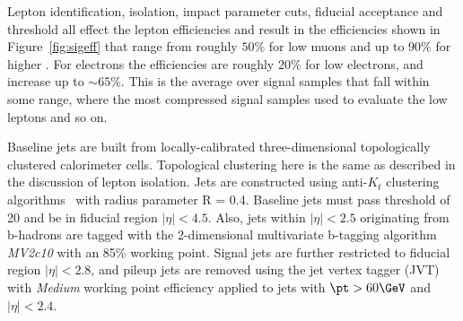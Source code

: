 Lepton identification, isolation, impact parameter cuts, fiducial acceptance and \pt threshold all effect the lepton efficiencies and result in the efficiencies shown in Figure~\ref{fig:sigeff} that range from roughly $50\%$ for low \pt muons and up to $90\%$ for higher \pt.  For electrons the efficiencies are roughly $20\%$ for low \pt electrons, and increase up to $\sim65\%$.  This is the average over signal samples that fall within some range, where the most compressed signal samples used to evaluate the low \pt leptons and so on.

Baseline jets are built from locally-calibrated three-dimensional topologically clustered calorimeter cells.  Topological clustering here is the same as described in the discussion of lepton isolation.  Jets are constructed using anti-$K_t$ clustering algorithms~\cite{antikt} with radius parameter R = 0.4.   Baseline jets must pass \pt{} threshold of 20 \GeV and be in fiducial region $|\eta | < 4.5$.   Also, jets within $|\eta | < 2.5$ originating from b-hadrons are tagged with the 2-dimensional multivariate b-tagging algorithm \textit{MV2c10} with an 85\% working point.  Signal jets are further restricted to fiducial region $|\eta | < 2.8$, and pileup jets are removed using the jet vertex tagger (JVT) with \textit{Medium} working point efficiency applied to jets with $\pt>60\GeV$ and $|\eta|<2.4$. 

